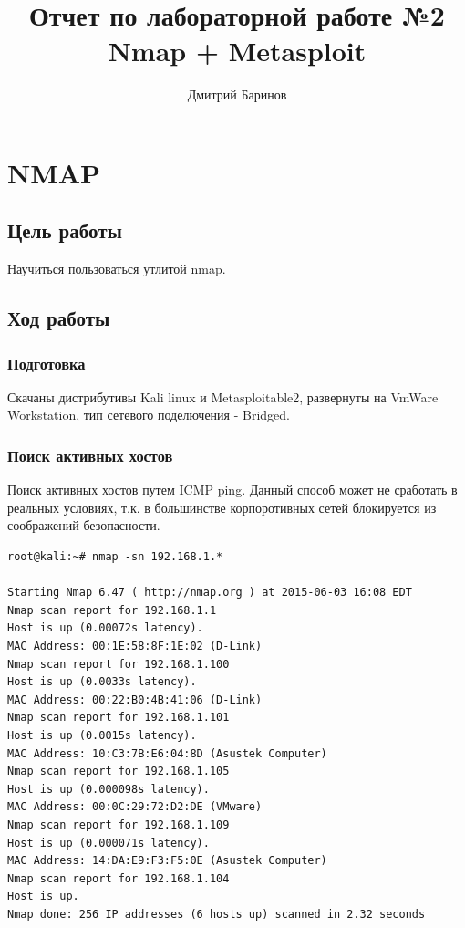 \documentclass[10pt,a4paper]{article}
\author{Дмитрий Баринов}
\title{Отчет по лабораторной работе №2 Nmap + Metasploit}
\begin{document}
\maketitle


\newpage

\section{NMAP}

\subsection{Цель работы}

Научиться пользоваться утлитой nmap.

\subsection{Ход работы}

\subsubsection{Подготовка}

Скачаны дистрибутивы Kali linux и Metasploitable2, развернуты на VmWare Workstation, тип сетевого поделючения - Bridged.


\subsubsection{Поиск активных хостов}

Поиск активных хостов путем ICMP ping. Данный способ может не сработать в реальных условиях, т.к. в большинстве корпоротивных сетей блокируется из соображений безопасности.

\begin{verbatim}
root@kali:~# nmap -sn 192.168.1.*

Starting Nmap 6.47 ( http://nmap.org ) at 2015-06-03 16:08 EDT
Nmap scan report for 192.168.1.1
Host is up (0.00072s latency).
MAC Address: 00:1E:58:8F:1E:02 (D-Link)
Nmap scan report for 192.168.1.100
Host is up (0.0033s latency).
MAC Address: 00:22:B0:4B:41:06 (D-Link)
Nmap scan report for 192.168.1.101
Host is up (0.0015s latency).
MAC Address: 10:C3:7B:E6:04:8D (Asustek Computer)
Nmap scan report for 192.168.1.105
Host is up (0.000098s latency).
MAC Address: 00:0C:29:72:D2:DE (VMware)
Nmap scan report for 192.168.1.109
Host is up (0.000071s latency).
MAC Address: 14:DA:E9:F3:F5:0E (Asustek Computer)
Nmap scan report for 192.168.1.104
Host is up.
Nmap done: 256 IP addresses (6 hosts up) scanned in 2.32 seconds

\end{verbatim}
\end{document}
